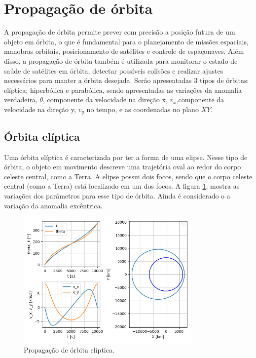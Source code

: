 \section{Propagação de órbita}

A propagação de órbita permite prever com precisão a posição futura de um objeto em órbita, o que é fundamental para o planejamento de missões espaciais, manobras orbitais, posicionamento de satélites e controle de espaçonaves. Além disso, a propagação de órbita também é utilizada para monitorar o estado de saúde de satélites em órbita, detectar possíveis colisões e realizar ajustes necessários para manter a órbita desejada. Serão apresentadas 3 tipos de órbitas: elíptica; hiperbólica e parabólica, sendo apresentadas as variações da anomalia verdadeira, $\theta$, componente da velocidade na direção x, $v_x$,componente da velocidade na direção y, $v_y$ no tempo, e as coordenadas no plano $XY$.

\subsection{Órbita elíptica}

Uma órbita elíptica é caracterizada por ter a forma de uma elipse. Nesse tipo de órbita, o objeto em movimento descreve uma trajetória oval ao redor do corpo celeste central, como a Terra. A elipse possui dois focos, sendo que o corpo celeste central (como a Terra) está localizado em um dos focos. A figura \ref{fig: Resultado - Propagação de órbita elíptica}, mostra as variações dos parâmetros para esse tipo de órbita. Ainda é considerado o a variação da anomalia excêntrica.

\begin{figure}[H]
\centering
\caption{Propagação de órbita elíptica.}
\label{fig: Resultado - Propagação de órbita elíptica}
\includegraphics[width=0.8\textwidth]{figuras/Resultados/aula6_eliptica.png}
\end{figure}

